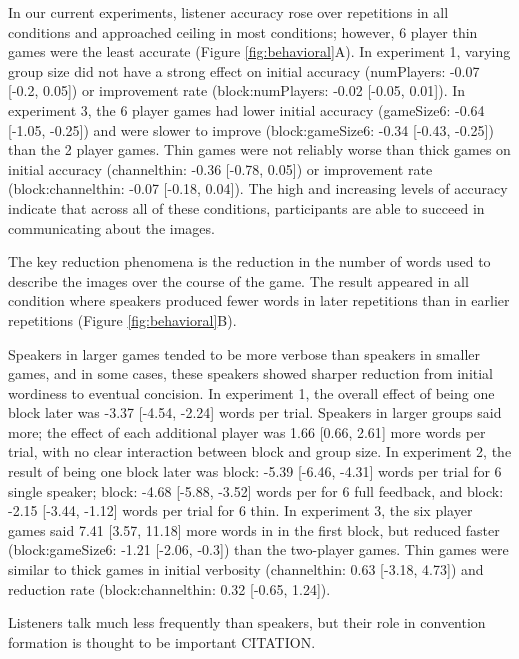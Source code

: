 \documentclass[
  english,
  a4paper,
]{article}
\begin{document}
In our current experiments, listener accuracy rose over repetitions in all conditions and approached ceiling in most conditions; however, 6 player thin games were the least accurate (Figure \ref{fig:behavioral}A). In experiment 1, varying group size did not have a strong effect on initial accuracy (numPlayers: -0.07 {[}-0.2, 0.05{]}) or improvement rate (block:numPlayers: -0.02 {[}-0.05, 0.01{]}). In experiment 3, the 6 player games had lower initial accuracy (gameSize6: -0.64 {[}-1.05, -0.25{]}) and were slower to improve (block:gameSize6: -0.34 {[}-0.43, -0.25{]}) than the 2 player games. Thin games were not reliably worse than thick games on initial accuracy (channelthin: -0.36 {[}-0.78, 0.05{]}) or improvement rate (block:channelthin: -0.07 {[}-0.18, 0.04{]}). The high and increasing levels of accuracy indicate that across all of these conditions, participants are able to succeed in communicating about the images.

The key reduction phenomena is the reduction in the number of words used to describe the images over the course of the game. The result appeared in all condition where speakers produced fewer words in later repetitions than in earlier repetitions (Figure \ref{fig:behavioral}B).

Speakers in larger games tended to be more verbose than speakers in smaller games, and in some cases, these speakers showed sharper reduction from initial wordiness to eventual concision. In experiment 1, the overall effect of being one block later was -3.37 {[}-4.54, -2.24{]} words per trial. Speakers in larger groups said more; the effect of each additional player was 1.66 {[}0.66, 2.61{]} more words per trial, with no clear interaction between block and group size. In experiment 2, the result of being one block later was block: -5.39 {[}-6.46, -4.31{]} words per trial for 6 single speaker; block: -4.68 {[}-5.88, -3.52{]} words per for 6 full feedback, and block: -2.15 {[}-3.44, -1.12{]} words per trial for 6 thin. In experiment 3, the six player games said 7.41 {[}3.57, 11.18{]} more words in in the first block, but reduced faster (block:gameSize6: -1.21 {[}-2.06, -0.3{]}) than the two-player games. Thin games were similar to thick games in initial verbosity (channelthin: 0.63 {[}-3.18, 4.73{]}) and reduction rate (block:channelthin: 0.32 {[}-0.65, 1.24{]}).

Listeners talk much less frequently than speakers, but their role in convention formation is thought to be important CITATION.
\end{document}
